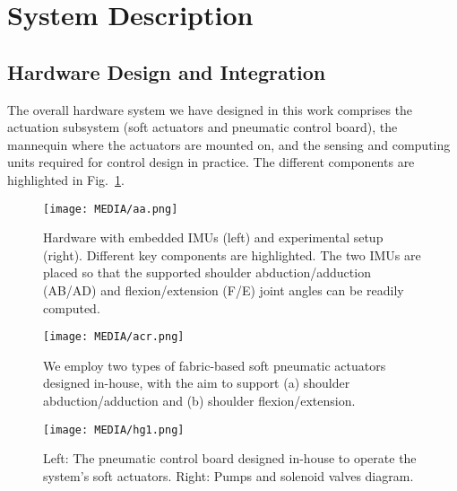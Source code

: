 \documentclass[letterpaper, 10pt, conference]{ieeeconf}      %
\begin{document}
\section{System Description}
\label{sec:problem}

\subsection{Hardware Design and Integration}
The overall hardware system we have designed in this work comprises the actuation subsystem (soft actuators and pneumatic control board), the mannequin where the actuators are mounted on, and the sensing and computing units required for control design in practice. The different components are highlighted in Fig.~\ref{fig:comp}. 

\begin{figure}[!t]
\vspace{6pt}
\centering
\texttt{[image: MEDIA/aa.png]}
\vspace{-18pt}
\caption{Hardware with embedded IMUs (left) and experimental setup (right). Different key components are highlighted. The two IMUs are placed so that the supported shoulder abduction/adduction (AB/AD) and flexion/extension (F/E) joint angles can be readily computed.}
\label{fig:comp}
\vspace{0pt}
\end{figure}

\begin{figure}[!t]
\vspace{-3pt}
\texttt{[image: MEDIA/acr.png]}
\vspace{-21pt}
\caption{We employ two types of fabric-based soft pneumatic actuators designed in-house, with the aim to support (a) shoulder abduction/adduction and (b) shoulder flexion/extension.} \label{fig:act}
\vspace{0pt}
\label{fig:sac}
\end{figure}

\begin{figure}[!t]
\vspace{-3pt}
\centering 
\texttt{[image: MEDIA/hg1.png]}
\vspace{-25pt}
\caption{Left: The pneumatic control board designed in-house to operate the system's soft actuators.
Right: Pumps and solenoid valves diagram.}
\label{fig:pneu}
\vspace{-12pt}
\end{figure}
\end{document}

